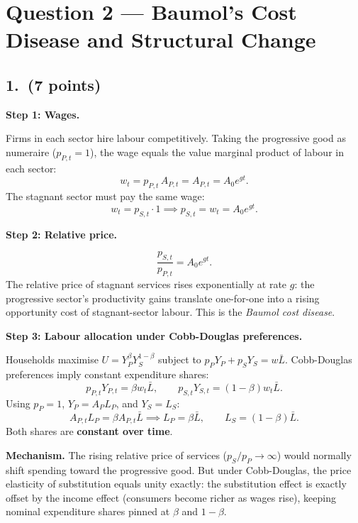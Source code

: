 \documentclass[a4paper,11pt]{article}
\begin{document}
\clearpage

\section{Question 2 --- Baumol's Cost Disease and Structural Change}

\subsection*{1.\ (7 points)}

\begin{answerbox}
\textbf{Step 1: Wages.}

Firms in each sector hire labour competitively.  Taking the progressive good as numeraire ($p_{P,t} = 1$), the wage equals the value marginal product of labour in each sector:
\[
    w_t = p_{P,t}\,A_{P,t} = A_{P,t} = A_0 e^{gt}.
\]
The stagnant sector must pay the same wage:
\[
    w_t = p_{S,t} \cdot 1 \implies p_{S,t} = w_t = A_0 e^{gt}.
\]

\textbf{Step 2: Relative price.}

\[
    \boxed{\frac{p_{S,t}}{p_{P,t}} = A_0 e^{gt}.}
\]
The relative price of stagnant services rises exponentially at rate $g$: the progressive sector's productivity gains translate one-for-one into a rising opportunity cost of stagnant-sector labour.  This is the \emph{Baumol cost disease}.

\textbf{Step 3: Labour allocation under Cobb-Douglas preferences.}

Households maximise $U = Y_P^{\beta} Y_S^{1-\beta}$ subject to $p_{P}Y_P + p_{S}Y_S = w\bar{L}$.  Cobb-Douglas preferences imply constant expenditure shares:
\[
    p_{P,t} Y_{P,t} = \beta w_t \bar{L}, \qquad p_{S,t} Y_{S,t} = (1-\beta)w_t\bar{L}.
\]
Using $p_{P}=1$, $Y_P = A_P L_P$, and $Y_S = L_S$:
\[
    A_{P,t} L_P = \beta A_{P,t}\bar{L} \implies L_P = \beta\bar{L},
    \qquad L_S = (1-\beta)\bar{L}.
\]
Both shares are \textbf{constant over time}.

\textbf{Mechanism.}  The rising relative price of services ($p_S/p_P \to \infty$) would normally shift spending toward the progressive good.  But under Cobb-Douglas, the price elasticity of substitution equals unity exactly: the substitution effect is exactly offset by the income effect (consumers become richer as wages rise), keeping nominal expenditure shares pinned at $\beta$ and $1-\beta$.
\end{answerbox}
\end{document}
